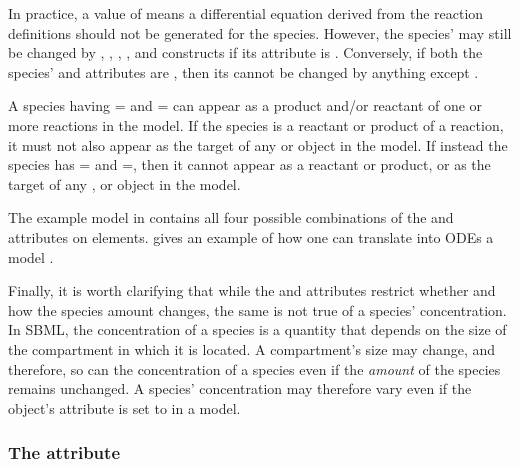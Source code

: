 In practice, a  value of  means
a differential equation derived from the reaction definitions
should not be generated for the species.  However, the species'
 may still be changed by \AssignmentRule, \RateRule,
\AlgebraicRule, \Event, and \InitialAssignment constructs if its
 attribute is .  Conversely, if both
the species'  and 
attributes are , then its  cannot be changed by
anything except \InitialAssignment.

A species having = and
= can appear as a product and/or
reactant of one or more reactions in the model.  If the species is
a reactant or product of a reaction, it must not also appear as
the target of any \AssignmentRule or \RateRule object in the
model.  If instead the species has
= and
=, then it cannot appear as a reactant
or product, or as the target of any \AssignmentRule, \RateRule or
\EventAssignment object in the model.

The example model in  contains
all four possible combinations of the 
and  attributes on  elements.
 gives an example of how one can translate
into ODEs a model .

\begin{blockChanged}
Finally, it is worth clarifying that while the  and  attributes restrict whether and how the species amount changes, the same is not true of a species' concentration.  In SBML, the concentration of a species is a quantity that depends on the size of the compartment in which it is located.  A compartment's size may change, and therefore, so can the concentration of a species even if the \emph{amount} of the species remains unchanged.  A species' concentration may therefore vary even if the \Species object's  attribute is set to  in a model.
\end{blockChanged}


\subsubsection{The  attribute}
\label{sec:species-conversion}

